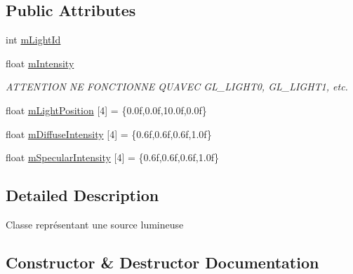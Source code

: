 \subsection*{Public Attributes}
\begin{DoxyCompactItemize}
\item 
int \hyperlink{struct_light_source_data_1_1_point_light_source_af1e590645aa46ca01388ee4204f17eb7}{m\+Light\+Id}
\item 
float \hyperlink{struct_light_source_data_1_1_point_light_source_af7c91e317104049245c90bc39cdc9d7c}{m\+Intensity}
\begin{DoxyCompactList}\small\item\em A\+T\+T\+E\+N\+T\+I\+ON NE F\+O\+N\+C\+T\+I\+O\+N\+NE QU\textquotesingle{}A\+V\+EC G\+L\+\_\+\+L\+I\+G\+H\+T0, G\+L\+\_\+\+L\+I\+G\+H\+T1, etc. \end{DoxyCompactList}\item 
float \hyperlink{struct_light_source_data_1_1_point_light_source_a54b8bcb5e6c8779065b39137b54e7a4a}{m\+Light\+Position} \mbox{[}4\mbox{]} = \{0.\+0f,0.\+0f,10.\+0f,0.\+0f\}
\item 
float \hyperlink{struct_light_source_data_1_1_point_light_source_ad13d5b37ea396ed9b299943605f0bf42}{m\+Diffuse\+Intensity} \mbox{[}4\mbox{]} = \{0.\+6f,0.\+6f,0.\+6f,1.\+0f\}
\item 
float \hyperlink{struct_light_source_data_1_1_point_light_source_ad561b4571eac75209782dd6a5ac2cabd}{m\+Specular\+Intensity} \mbox{[}4\mbox{]} = \{0.\+6f,0.\+6f,0.\+6f,1.\+0f\}
\end{DoxyCompactItemize}


\subsection{Detailed Description}
Classe représentant une source lumineuse 

\subsection{Constructor \& Destructor Documentation}
